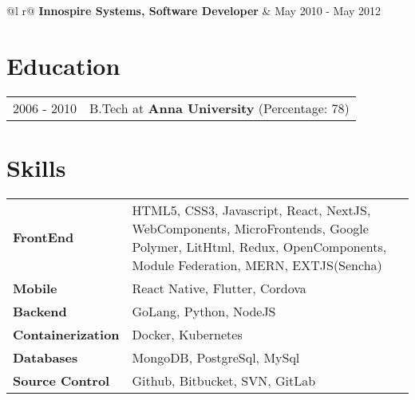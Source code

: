 \documentclass[a4paper,12pt]{article}
\begin{document}
\begin{tabularx}{\linewidth}{ @{}l r@{} }
\textbf{Innospire Systems, Software Developer} & \hfill May 2010 - May 2012 \\[3.75pt]
\end{tabularx}

\section{Education}
\begin{tabularx}{\linewidth}{@{}l X@{}}	
2006 - 2010 & B.Tech at \textbf{Anna University} \hfill (Percentage: 78) \\ 
\end{tabularx}

\section{Skills}
\begin{tabularx}{\linewidth}{@{}l X@{}}
\textbf{FrontEnd}&  \normalsize{HTML5, CSS3, Javascript, React, NextJS, WebComponents, MicroFrontends, Google Polymer, LitHtml, Redux, OpenComponents, Module Federation, MERN, EXTJS(Sencha)}\\
\textbf{Mobile}  &  \normalsize{React Native, Flutter, Cordova}\\
\textbf{Backend}  &  \normalsize{GoLang, Python, NodeJS}\\
\textbf{Containerization}  &  \normalsize{Docker, Kubernetes}\\
\textbf{Databases}  &  \normalsize{MongoDB, PostgreSql, MySql}\\
\textbf{Source Control}  &  \normalsize{Github, Bitbucket, SVN, GitLab}\\
\end{tabularx}
\end{document}
